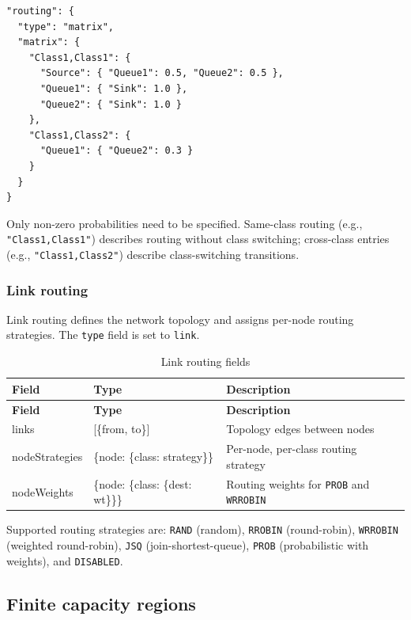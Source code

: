 \begin{lstlisting}[basicstyle=\ttfamily\scriptsize]
"routing": {
  "type": "matrix",
  "matrix": {
    "Class1,Class1": {
      "Source": { "Queue1": 0.5, "Queue2": 0.5 },
      "Queue1": { "Sink": 1.0 },
      "Queue2": { "Sink": 1.0 }
    },
    "Class1,Class2": {
      "Queue1": { "Queue2": 0.3 }
    }
  }
}
\end{lstlisting}
Only non-zero probabilities need to be specified. Same-class routing (e.g., \texttt{"Class1,Class1"}) describes routing without class switching; cross-class entries (e.g., \texttt{"Class1,Class2"}) describe class-switching transitions.

\subsubsection{Link routing}
\label{json:routing-link}

Link routing defines the network topology and assigns per-node routing strategies. The \texttt{type} field is set to \texttt{link}.

\begin{footnotesize}
\begin{longtable}{|T{2.8cm}|T{3.5cm}|D{6.6cm}|}
\caption{Link routing fields}\label{tab:json-linkrouting}
\\\hline
\textbf{Field} & \textbf{Type} & \textbf{Description} \\\hline
\endfirsthead
\hline \textbf{Field} & \textbf{Type} & \textbf{Description} \\\hline
\endhead
\hline
\endfoot
links & [\{from, to\}] & Topology edges between nodes \\\hline
nodeStrategies & \{node: \{class: strategy\}\} & Per-node, per-class routing strategy \\\hline
nodeWeights & \{node: \{class: \{dest: wt\}\}\} & Routing weights for \texttt{PROB} and \texttt{WRROBIN} \\\hline
\end{longtable}
\end{footnotesize}

Supported routing strategies are: \texttt{RAND} (random), \texttt{RROBIN} (round-robin), \texttt{WRROBIN} (weighted round-robin), \texttt{JSQ} (join-shortest-queue), \texttt{PROB} (probabilistic with weights), and \texttt{DISABLED}.

\subsection{Finite capacity regions}
\label{json:fcr}

